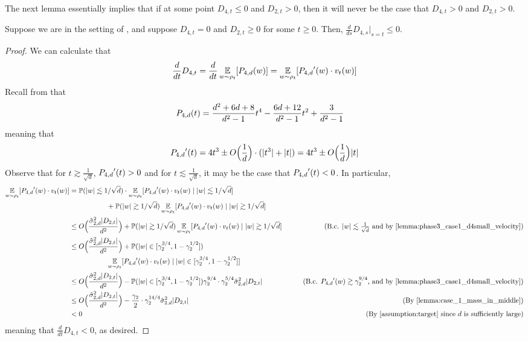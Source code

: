 The next lemma essentially implies that if at some point $D_{4, t} \leq 0$ and $D_{2, t} > 0$, then it will never be the case that $D_{4, t} > 0$ and $D_{2, t} > 0$.

\begin{lemma} \label{lemma:phase3_case1_fixedA}
Suppose we are in the setting of , and suppose $D_{4, t} = 0$ and $D_{2, t} \geq 0$ for some $t \geq 0$. Then, $\frac{d}{ds} D_{4, s} \Big|_{s = t} \leq 0$.
\end{lemma}
\begin{proof}
We can calculate that
\begin{align}
\frac{d}{dt} D_{4, t} = \frac{d}{dt} \operatorname*{\mathbb{E}}_{w \sim \rho_t}[{P_{4, d}}(w)] = \operatorname*{\mathbb{E}}_{w \sim \rho_t}[{P_{4, d}}'(w) \cdot v_t(w)]
\end{align}
Recall from  that
\begin{align}
{P_{4, d}}(t)
& = \frac{d^2 + 6d + 8}{d^2 - 1} t^4 - \frac{6d + 12}{d^2 - 1} t^2 + \frac{3}{d^2 - 1}
\end{align}
meaning that
\begin{align}
{P_{4, d}}'(t) = 4t^3 \pm O\Big(\frac{1}{d}\Big) \cdot (|t^3| + |t|) = 4t^3 \pm O\Big(\frac{1}{d}\Big) |t|
\end{align}
Observe that for $t \gtrsim \frac{1}{\sqrt{d}}$, ${P_{4, d}}'(t) > 0$ and for $t \lesssim \frac{1}{\sqrt{d}}$, it may be the case that ${P_{4, d}}'(t) < 0$. In particular,
\begin{align}
\E_{\w \sim \rho_t}[\PfourD'(\w) \cdot \vel_t(\w)]
& = \Prob(|\w| \lesssim 1/\sqrt{d}) \cdot \E_{\w \sim \rho_t}[\PfourD'(\w) \cdot \vel_t(\w) \mid |\w| \lesssim 1/\sqrt{d}] \\
& \nextlinespace\nextlinespace + \Prob(|\w| \gtrsim 1/\sqrt{d}) \E_{\w \sim \rho_t}[\PfourD'(\w) \cdot \vel_t(\w) \mid |\w| \gtrsim 1/\sqrt{d}] \\
& \leq O\Big(\frac{\sigmaCoeffTwo^2 |D_{2, t}|}{d^2}\Big) + \Prob(|\w| \gtrsim 1/\sqrt{d}) \E_{\w \sim \rho_t}[\PfourD'(\w) \cdot \vel_t(\w) \mid |\w| \gtrsim 1/\sqrt{d}]
& \tag{B.c. $|\w| \lesssim \frac{1}{\sqrt{d}}$ and by \Cref{lemma:phase3_case1_d4small_velocity}} \\
& \leq O\Big(\frac{\sigmaCoeffTwo^2 |D_{2, t}|}{d^2}\Big) + \Prob(|\w| \in [\gamma_2^{3/4}, 1 - \gamma_2^{1/2}]) \\
& \nextlinespace\nextlinespace \E_{\w \sim \rho_t}[\PfourD'(\w) \cdot \vel_t(\w) \mid |\w| \in [\gamma_2^{3/4}, 1 - \gamma_2^{1/2}]] \\
& \leq O\Big(\frac{\sigmaCoeffTwo^2 |D_{2, t}|}{d^2}\Big) - \Prob(|\w| \in [\gamma_2^{3/4}, 1 - \gamma_2^{1/2}]) \gamma_2^{9/4} \cdot \gamma_2^{5/4} \sigmaCoeffTwo^2 |D_{2, t}|
& \tag{B.c. $\PfourD'(\w) \gtrsim \gamma_2^{9/4}$, and by \Cref{lemma:phase3_case1_d4small_velocity}} \\
& \leq O\Big(\frac{\sigmaCoeffTwo^2 |D_{2, t}|}{d^2}\Big) - \frac{\gamma_2}{2} \cdot \gamma_2^{14/4} \sigmaCoeffTwo^2 |D_{2, t}|
& \tag{By \Cref{lemma:case_1_mass_in_middle}} \\
& < 0
& \tag{By \Cref{assumption:target} since $d$ is sufficiently large}
\end{align}
meaning that $\frac{d}{dt} D_{4, t} < 0$, as desired.
\end{proof}

